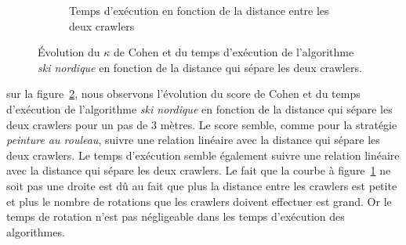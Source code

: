 \documentclass[francais,RandD]{rapportPFE}
\begin{document}
\begin{figure}[h!]
\begin{subfigure}[t]{0.49\linewidth}
						\caption{Temps d'exécution en fonction de la distance entre les deux crawlers}
						\label{fig:ski_nordique-time_vs_distance}
				\end{subfigure}
				\caption{Évolution du $\kappa$ de Cohen et du temps d'exécution de l'algorithme \textit{ski nordique} en fonction de la distance qui sépare les deux crawlers.}
				\label{fig:ski_nordique-distance}
			\end{figure}

			sur la figure~\ref{fig:ski_nordique-distance}, nous observons l'évolution du score de Cohen et du temps d'exécution de l'algorithme \textit{ski nordique} en fonction de la distance qui sépare les deux crawlers pour un pas de 3 mètres.
			Le score semble, comme pour la stratégie \textit{peinture au rouleau}, suivre une relation linéaire avec la distance qui sépare les deux crawlers.
			Le temps d'exécution semble également suivre une relation linéaire avec la distance qui sépare les deux crawlers.
			Le fait que la courbe à figure~\ref{fig:ski_nordique-time_vs_distance} ne soit pas une droite est dû au fait que plus la distance entre les crawlers est petite et plus le nombre de rotations que les crawlers doivent effectuer est grand.
			Or le temps de rotation n'est pas négligeable dans les temps d'exécution des algorithmes.
\end{document}
